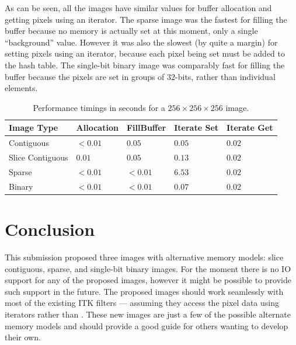 \documentclass{InsightArticle}
\begin{document}
As can be seen, all the images have similar values for buffer allocation and 
getting pixels using an iterator.
The sparse image was the fastest for filling the buffer
because no memory is actually set at this moment, only a single ``background'' value.
However it was also the slowest (by quite a margin) for setting pixels using an iterator,
because each pixel being set must be added to the hash table.
The single-bit binary image was comparably fast for filling the buffer because
the pixels are set in groups of 32-bits, rather than individual elements.%
%
%
\begin{table}[!htb]
\begin{center}
\begin{tabular}{l|llll}
    \hline
    Image Type & Allocation & FillBuffer & Iterate Set & Iterate Get \\
    \hline
    \hline
	  Contiguous & $< 0.01$ & $0.05$ & $0.05$ & $0.02$ \\
	  Slice Contiguous & $0.01$ & $0.05$ & $0.13$ & $0.02$ \\
	  Sparse & $< 0.01$ & $< 0.01$ & $6.53$ & $0.02$ \\
	  Binary & $< 0.01$ & $< 0.01$ & $0.07$ & $0.02$ \\
    \hline
\end{tabular}
\caption[Performance results (in seconds)]
{Performance timings in seconds for a $256 \times 256 \times 256$ image.}
\label{table:performance}
\end{center}
\end{table}

\section{Conclusion}
This submission proposed three images with alternative memory models:
slice contiguous, sparse, and single-bit binary images.
For the moment there is no IO support for any of the proposed images,
however it might be possible to provide such support in the future.
The proposed images should work seamlessly with most of the existing ITK filters
--- assuming they access the pixel data using iterators rather than
.
These new images are just a few of the possible alternate memory models
and should provide a good guide for others wanting to develop their own.
\end{document}

